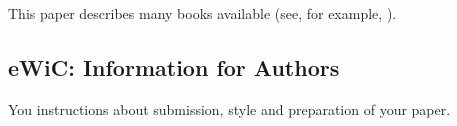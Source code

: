 
This paper describes  many books
available (see, for example, \cite{Companion,KopkaDaly,Lamport}).

\subsection{eWiC: Information for Authors}
You  instructions about submission, style and preparation of your paper.